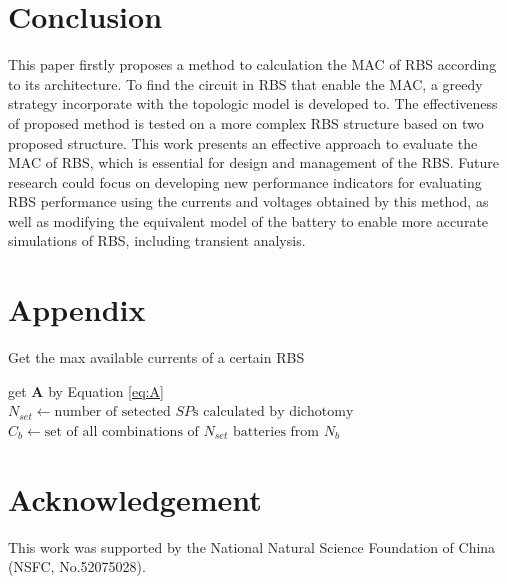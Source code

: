 \documentclass{article}
\begin{document}
\section{Conclusion}

This paper firstly proposes a method to calculation the MAC of RBS according to its architecture. 
To find the circuit in RBS that enable the MAC, a greedy strategy incorporate with the topologic model is developed to. 
The effectiveness of proposed method is tested on a more complex RBS structure based on two proposed structure.
This work presents an effective approach to evaluate the MAC of RBS, which is essential for design and management of the RBS. 
Future research could focus on developing new performance indicators for evaluating RBS performance using the currents and voltages obtained by this method, as well as modifying the equivalent model of the battery to enable more accurate simulations of RBS, including transient analysis.

\section{Appendix} 
\begin{algorithm}
    \caption{Get the max available currents of a certain RBS}\label{alg:eta_RBS}
    \KwResult{$\max \eta$}
    get $\bm{A}$ by Equation \ref{eq:A}\;
    {
        $N_{set} \leftarrow \text{number of setected $SP$s calculated by dichotomy}$\;
        $C_b    \leftarrow \text{set of all combinations of $N_{set} $~batteries from $N_b$}$\;
    }
\end{algorithm}

\section{Acknowledgement}
This work was supported by the National Natural Science Foundation of China (NSFC, No.52075028).



\end{document}

